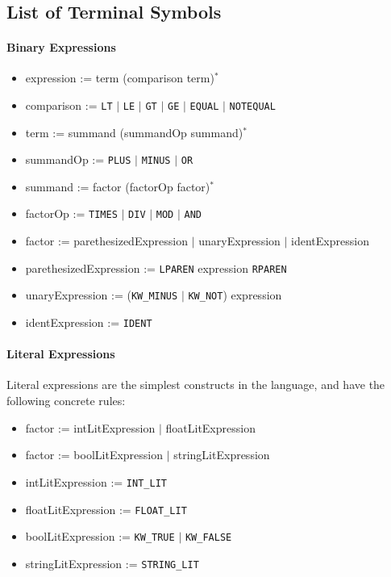\chapter{}

\section{List of Terminal Symbols}
\label{sec:symbols}

\subsubsection{Binary Expressions}

\begin{itemize}
	\item expression := term (comparison term)$^*$
	\item comparison := \texttt{LT} $|$ \texttt{LE} $|$ \texttt{GT} $|$ \texttt{GE} $|$ \texttt{EQUAL} $|$ \texttt{NOTEQUAL}
	\item term := summand (summandOp summand)$^*$
	\item summandOp := \texttt{PLUS} $|$ \texttt{MINUS} $|$ \texttt{OR}
	\item summand := factor (factorOp factor)$^*$
	\item factorOp := \texttt{TIMES} $|$ \texttt{DIV} $|$ \texttt{MOD} $|$ \texttt{AND}
	\item factor := parethesizedExpression $|$ unaryExpression $|$ identExpression
	\item parethesizedExpression := \texttt{LPAREN} expression \texttt{RPAREN}
	\item unaryExpression := (\texttt{KW\_MINUS} $|$ \texttt{KW\_NOT}) expression
	\item identExpression := \texttt{IDENT}
\end{itemize}

\subsubsection{Literal Expressions}

Literal expressions are the simplest constructs in the language, and have the following concrete rules:

\begin{itemize}
	\item factor := intLitExpression $|$ floatLitExpression
	\item factor := boolLitExpression $|$ stringLitExpression
	\item intLitExpression := \texttt{INT\_LIT}
	\item floatLitExpression := \texttt{FLOAT\_LIT}
	\item boolLitExpression := \texttt{KW\_TRUE} $|$ \texttt{KW\_FALSE}
	\item stringLitExpression := \texttt{STRING\_LIT}
\end{itemize}

